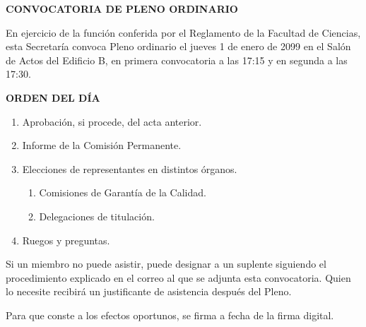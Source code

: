 \documentclass[11pt,a4paper]{article}
\begin{document}
\begin{center}
{\Large\bfseries CONVOCATORIA DE PLENO ORDINARIO}
\end{center}

En ejercicio de la función conferida por el Reglamento \delorgano{} de la
Facultad de Ciencias, esta Secretaría convoca Pleno ordinario el jueves 1 de
enero de 2099 en el Salón de Actos del Edificio B, en primera convocatoria a
las 17:15 y en segunda a las 17:30.

\begin{center}{\bfseries ORDEN DEL DÍA}\end{center}

\begin{enumerate}
\item Aprobación, si procede, del acta anterior.
\item Informe de la Comisión Permanente.
\item Elecciones de representantes en distintos órganos.
  \begin{enumerate}[label=\arabic{enumi}.\arabic*.]
  \item Comisiones de Garantía de la Calidad.
  \item Delegaciones de titulación.
  \end{enumerate}
\item Ruegos y preguntas.
\end{enumerate}

Si un miembro no puede asistir, puede designar a un suplente siguiendo el
procedimiento explicado en el correo al que se adjunta esta convocatoria.
Quien lo necesite recibirá un justificante de asistencia después del Pleno.

Para que conste a los efectos oportunos, se firma a fecha de la firma digital.
\firma
\end{document}
